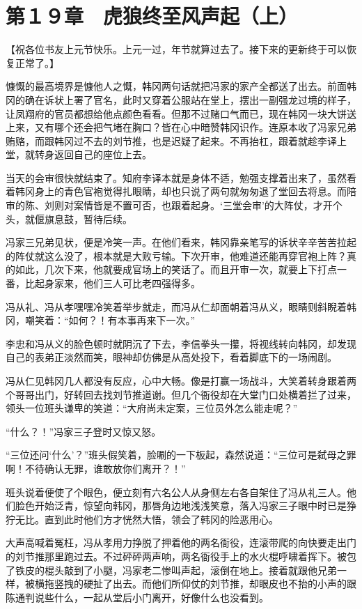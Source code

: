 \section{第１９章　虎狼终至风声起（上）}

【祝各位书友上元节快乐。上元一过，年节就算过去了。接下来的更新终于可以恢复正常了。】

慷慨的最高境界是慷他人之慨，韩冈两句话就把冯家的家产全都送了出去。前面韩冈的确在诉状上署了官名，此时又穿着公服站在堂上，摆出一副强龙过境的样子，让凤翔府的官员都想给他点颜色看看。但那不过赌口气而已，现在韩冈一块大饼送上来，又有哪个还会把气堵在胸口？皆在心中暗赞韩冈识作。连原本收了冯家兄弟贿赂，而跟韩冈过不去的刘节推，也是迟疑了起来。不再抬杠，跟着就趁李译上堂，就转身返回自己的座位上去。

当天的会审很快就结束了。知府李译本就是身体不适，勉强支撑着出来了，虽然看着韩冈身上的青色官袍觉得扎眼睛，却也只说了两句就匆匆退了堂回去将息。而陪审的陈、刘则对案情皆是不置可否，也跟着起身。‘三堂会审’的大阵仗，才开个头，就偃旗息鼓，暂待后续。

冯家三兄弟见状，便是冷笑一声。在他们看来，韩冈靠亲笔写的诉状辛辛苦苦拉起的阵仗就这么没了，根本就是大败亏输。下次开审，他难道还能再穿官袍上阵？真的如此，几次下来，他就要成官场上的笑话了。而且开审一次，就要上下打点一番，比起身家来，他们三人可比老四强得多。

冯从礼、冯从孝嘿嘿冷笑着举步就走，而冯从仁却面朝着冯从义，眼睛则斜睨着韩冈，嘲笑着：“如何？！有本事再来下一次。”

李忠和冯从义的脸色顿时就阴沉了下去，李信拳头一攥，将视线转向韩冈，却发现自己的表弟正淡然而笑，眼神却仿佛是从高处投下，看着脚底下的一场闹剧。

冯从仁见韩冈几人都没有反应，心中大畅。像是打赢一场战斗，大笑着转身跟着两个哥哥出门，好转回去找刘节推道谢。但几个衙役却在大堂门口处横着拦了过来，领头一位班头谦卑的笑道：“大府尚未定案，三位员外怎么能走呢？”

“什么？！”冯家三子登时又惊又怒。

“三位还问‘什么’？”班头假笑着，脸唰的一下板起，森然说道：“三位可是弑母之罪啊！不待确认无罪，谁敢放你们离开？！”

班头说着便使了个眼色，便立刻有六名公人从身侧左右各自架住了冯从礼三人。他们脸色开始泛青，惊望向韩冈，那唇角边地浅浅笑意，落入冯家三子眼中时已是狰狞无比。直到此时他们方才恍然大悟，领会了韩冈的险恶用心。

大声高喊着冤枉，冯从孝用力挣脱了押着他的两名衙役，连滚带爬的向快要走出门的刘节推那里跑过去。不过砰砰两声响，两名衙役手上的水火棍呼啸着挥下。被包了铁皮的棍头敲到了小腿，冯家老二惨叫声起，滚倒在地上。接着就跟他兄弟一样，被横拖竖拽的硬扯了出去。而他们所仰仗的刘节推，却眼皮也不抬的小声的跟陈通判说些什么，一起从堂后小门离开，好像什么也没看到。

